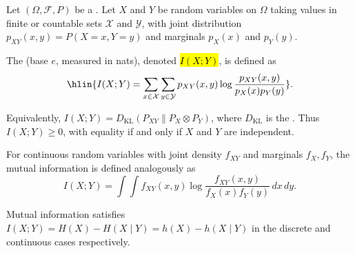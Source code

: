 \begin{definition} \label{definition:mutual_information_between_two_random_variables}
Let $(\Omega, \mathcal{F}, P)$ be a . Let $X$ and $Y$ be random variables on $\Omega$ taking values in finite or countable sets $\mathcal{X}$ and $\mathcal{Y}$, with joint distribution $p_{XY}(x, y) = P(X = x, Y = y)$ and marginals $p_X(x)$ and $p_Y(y)$.

The  (base $e$, measured in nats), denoted \hl{$I(X; Y)$}, is defined as
$$\hlin{I(X; Y) = \sum_{x \in \mathcal{X}} \sum_{y \in \mathcal{Y}} p_{XY}(x, y) \log \frac{p_{XY}(x, y)}{p_X(x) p_Y(y)}}.$$

Equivalently, $I(X; Y) = D_{\mathrm{KL}}(P_{XY} \| P_X \otimes P_Y)$, where $D_{\mathrm{KL}}$ is the . Thus $I(X; Y) \geq 0$, with equality if and only if $X$ and $Y$ are independent.

For continuous random variables with joint density $f_{XY}$ and marginals $f_X, f_Y$, the mutual information is defined analogously as
$$I(X; Y) = \int \int f_{XY}(x, y) \log \frac{f_{XY}(x, y)}{f_X(x) f_Y(y)} \, dx \, dy.$$

Mutual information satisfies $I(X; Y) = H(X) - H(X \mid Y) = h(X) - h(X \mid Y)$ in the discrete and continuous cases respectively.
\end{definition}
